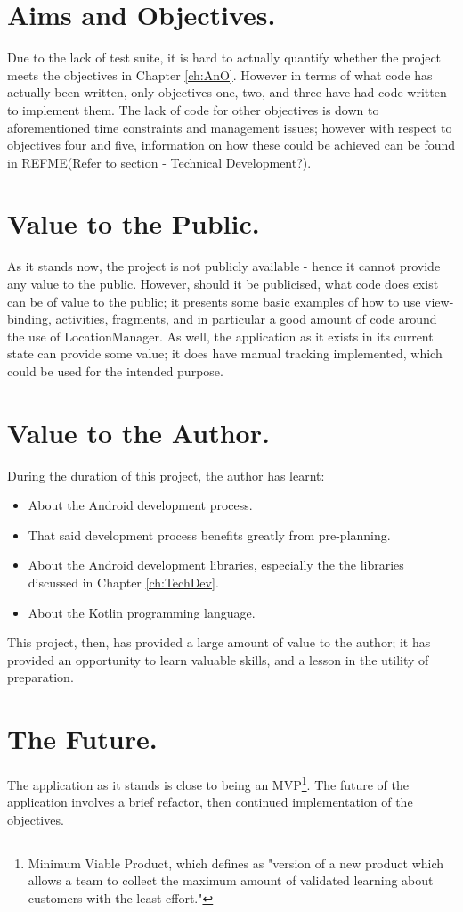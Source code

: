 \documentclass[11pt, a4paper, notitlepage]{report}
\begin{document}
\section{Aims and Objectives.}
Due to the lack of test suite, it is hard to actually quantify whether the project meets the objectives in Chapter \ref{ch:AnO}. However in terms of what code has actually been written, only objectives one, two, and three have had code written to implement them. The lack of code for other objectives is down to aforementioned time constraints and management issues; however with respect to objectives four and five, information on how these could be achieved can be found in REFME(Refer to section - Technical Development?).

\section{Value to the Public.}
As it stands now, the project is not publicly available - hence it cannot provide any value to the public. However, should it be publicised, what code does exist can be of value to the public; it presents some basic examples of how to use view-binding, activities, fragments, and in particular a good amount of code around the use of LocationManager. As well, the application as it exists in its current state can provide some value; it does have manual tracking implemented, which could be used for the intended purpose.

\section{Value to the Author.}
During the duration of this project, the author has learnt:
\begin{itemize}
	\item About the Android development process.
	\item That said development process benefits greatly from pre-planning.
	\item About the Android development libraries, especially the the libraries discussed in Chapter \ref{ch:TechDev}.
	\item About the Kotlin programming language.
\end{itemize}
This project, then, has provided a large amount of value to the author; it has provided an opportunity to learn valuable skills, and a lesson in the utility of preparation.

\section{The Future.}
The application as it stands is close to being an MVP\footnote{Minimum Viable Product, which \citet{mvpAGuide} defines as "version of a new product which allows a team to collect the maximum amount of validated learning about customers with the least effort."}. The future of the application involves a brief refactor, then continued implementation of the objectives.
\end{document}
